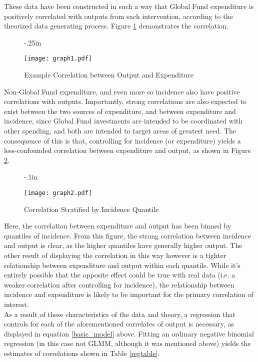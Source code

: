 \documentclass[twocolumn]{bmcart}%
\begin{document}
These data have been constructed in such a way that Global Fund expenditure is positively correlated with outputs from each intervention, according to the theorized data generating process. Figure \ref{fig1} demonstrates the correlation. \\

\begin{figure}[h]
  \advance\leftskip-.25in
  \caption{\textmd{Example Correlation between Output and Expenditure}}
  \texttt{[image: graph1.pdf]} \\
  \label{fig1}
\end{figure}

Non-Global Fund expenditure, and even more so incidence also have positive correlations with outputs. Importantly, strong correlations are also expected to exist between the two sources of expenditure, and between expenditure and incidence, since Global Fund investments are intended to be coordinated with other spending, and both are intended to target areas of greatest need. The consequence of this is that, controlling for incidence (or expenditure) yields a less-confounded correlation between expenditure and output, as shown in Figure \ref{fig2}.

\begin{figure}[h]
  \advance\leftskip-.1in
  \caption{\textmd{Correlation Stratified by Incidence Quantile}}
  \texttt{[image: graph2.pdf]} \\
  \label{fig2}
\end{figure}

Here, the correlation between expenditure and output has been binned by quantiles of incidence. From this figure, the strong correlation between incidence and output is clear, as the higher quantiles have generally higher output. The other result of displaying the correlation in this way however is a tighter relationship between expenditure and output within each quantile. While it's entirely possible that the opposite effect could be true with real data (i.e. a weaker correlation after controlling for incidence), the relationship between incidence and expenditure is likely to be important for the primary correlation of interest. \\

As a result of these characteristics of the data and theory, a regression that controls for each of the aforementioned correlates of output is necessary, as displayed in equation \ref{basic_model} above. Fitting an ordinary negative binomial regression (in this case not GLMM, although it was mentioned above) yields the estimates of correlations shown in Table \ref{regtable}.
\end{document}

